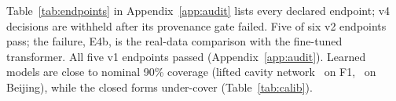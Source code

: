 Table~\ref{tab:endpoints} in Appendix~\ref{app:audit} lists every declared endpoint; v4 decisions are withheld after its provenance gate failed. Five of six v2 endpoints pass;
the failure, E4b, is the real-data comparison with the fine-tuned transformer. All five v1 endpoints passed
(Appendix~\ref{app:audit}).  Learned models are close to nominal 90\% coverage (lifted
cavity network \CalliftOneFcov\ on F1, \CalliftOneBcov\ on Beijing), while the closed forms under-cover
(Table~\ref{tab:calib}).
